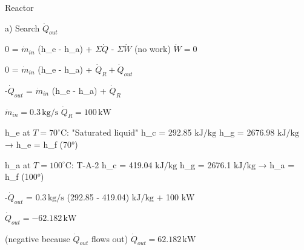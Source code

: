 Reactor  

a) Search \( \dot{Q}_{out} \)  

0 = \( \dot{m}_{in} \) (h_e - h_a) + \( \Sigma \dot{Q} \) - \( \Sigma \dot{W} \)  
(no work)  
\( \dot{W} = 0 \)  

0 = \( \dot{m}_{in} \) (h_e - h_a) + \( \dot{Q}_R + \dot{Q}_{out} \)  

-\( \dot{Q}_{out} \) = \( \dot{m}_{in} \) (h_e - h_a) + \( \dot{Q}_R \)  

\( \dot{m}_{in} = 0.3 \, \text{kg/s} \)  
\( \dot{Q}_R = 100 \, \text{kW} \)  

h_e at \( T = 70^\circ \text{C} \):  
"Saturated liquid"  
h_c = 292.85 \( \text{kJ/kg} \)  
h_g = 2676.98 \( \text{kJ/kg} \)  
→ h_e = h_f (70°)  

h_a at \( T = 100^\circ \text{C} \):  
T-A-2  
h_c = 419.04 \( \text{kJ/kg} \)  
h_g = 2676.1 \( \text{kJ/kg} \)  
→ h_a = h_f (100°)  

-\( \dot{Q}_{out} \) = \( 0.3 \, \text{kg/s} \) (292.85 - 419.04) \( \text{kJ/kg} \) + 100 \( \text{kW} \)  

\( \dot{Q}_{out} = -62.182 \, \text{kW} \)  

(negative because \( \dot{Q}_{out} \) flows out)  
\( \dot{Q}_{out} = 62.182 \, \text{kW} \)
